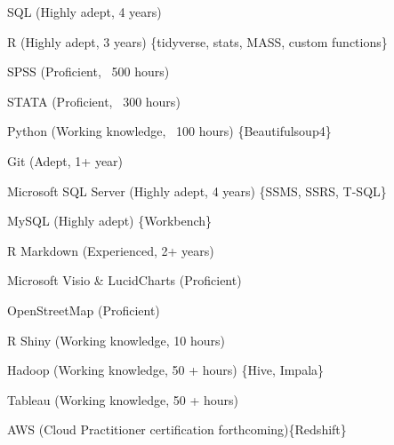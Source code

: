 



\cvsubsection{ }

\begin{cvitems} %
        \item {SQL (Highly adept, 4 years)}
        \item {R (Highly adept, 3 years) \{tidyverse, stats, MASS, custom functions\}}
        \item {SPSS (Proficient, ~500 hours)}
        \item {STATA (Proficient, ~300 hours)}
        \item {Python (Working knowledge, ~100 hours) \{Beautifulsoup4\}}
\end{cvitems}

\cvsubsection{ }


\cvsubsection{ }

\begin{cvitems} %
        \item {Git (Adept, 1+ year)}
        \item {Microsoft SQL Server (Highly adept, 4 years) \{SSMS, SSRS, T-SQL\}}
        \item {MySQL (Highly adept) \{Workbench\}}
        \item {R Markdown (Experienced, 2+ years)}
        \item {Microsoft Visio \& LucidCharts (Proficient)}
        \item {OpenStreetMap (Proficient)}
        \item {R Shiny (Working knowledge, 10 hours)}
        \item {Hadoop (Working knowledge, 50 + hours) \{Hive, Impala\}}
        \item {Tableau (Working knowledge, 50 + hours)}
        \item {AWS (Cloud Practitioner certification forthcoming)\{Redshift\}}
\end{cvitems}

\cvsubsection{ }




